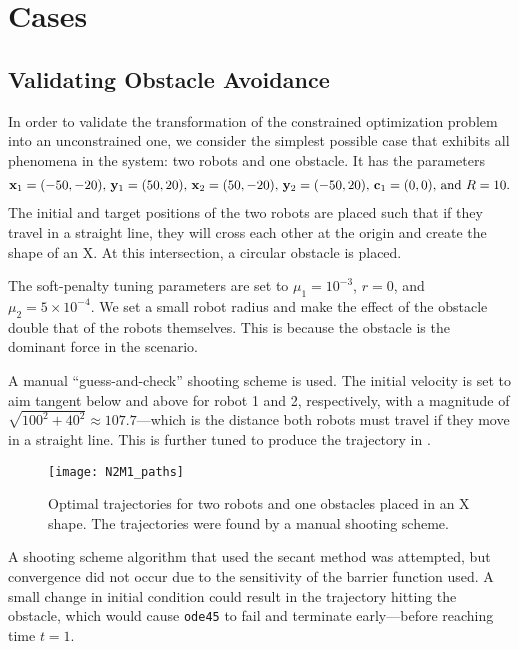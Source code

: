 \documentclass[11pt]{article}
\begin{document}
\clearpage

\section{Cases}

\subsection{Validating Obstacle Avoidance}

In order to validate the transformation of the constrained optimization problem into an unconstrained one, we consider the simplest possible case that exhibits all phenomena in the system: two robots and one obstacle. It has the parameters
\begin{align*}
	\mathbf{x}_1 = (-50,-20),\,\mathbf{y}_1 = (50,20),\,\mathbf{x}_2 = (50,-20),\,\mathbf{y}_2 = (-50,20),\,\mathbf{c}_1 = (0,0),\, \text{and } R = 10.
\end{align*}
The initial and target positions of the two robots are placed such that if they travel in a straight line, they will cross each other at the origin and create the shape of an X. At this intersection, a circular obstacle is placed.

The soft-penalty tuning parameters are set to \(\mu_1 = 10^{-3}\), \(r = 0\), and \(\mu_2 = 5 \times 10^{-4}\). We set a small robot radius and make the effect of the obstacle double that of the robots themselves. This is because the obstacle is the dominant force in the scenario.

A manual ``guess-and-check'' shooting scheme is used. The initial velocity is set to aim tangent below and above for robot 1 and 2, respectively, with a magnitude of \(\sqrt{100^2 + 40^2} \approx 107.7\)---which is the distance both robots must travel if they move in a straight line. This is further tuned to produce the trajectory in .

\begin{figure}
	\centering
	\texttt{[image: N2M1\_paths]}
	\caption{Optimal trajectories for two robots and one obstacles placed in an X shape. The trajectories were found by a manual shooting scheme.}
	\label{fig:n2m1-paths}
\end{figure}

A shooting scheme algorithm that used the secant method was attempted, but convergence did not occur due to the sensitivity of the barrier function used. A small change in initial condition could result in the trajectory hitting the obstacle, which would cause \texttt{ode45} to fail and terminate early---before reaching time \(t = 1\).
\end{document}
